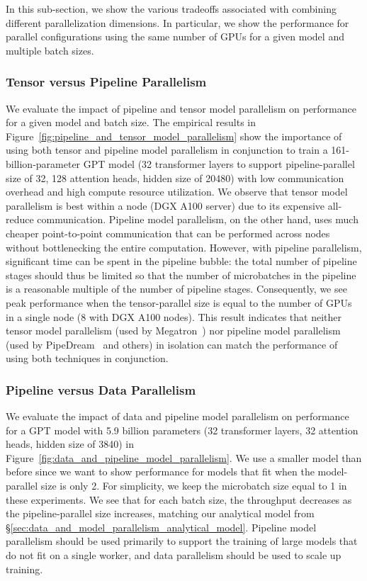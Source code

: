 In this sub-section, we show the various tradeoffs associated with combining different parallelization dimensions. In particular, we show the performance for parallel configurations using the same number of GPUs for a given model and multiple batch sizes.

\subsubsection{Tensor versus Pipeline Parallelism}

We evaluate the impact of pipeline and tensor model parallelism on performance for a given model and batch size. The empirical results in Figure~\ref{fig:pipeline_and_tensor_model_parallelism} show the importance of using both tensor and pipeline model parallelism in conjunction to train a 161-billion-parameter GPT model (32 transformer layers to support pipeline-parallel size of 32, 128 attention heads, hidden size of 20480) with low communication overhead and high compute resource utilization. We observe that tensor model parallelism is best within a node (DGX A100 server) due to its expensive all-reduce communication. Pipeline model parallelism, on the other hand, uses much cheaper point-to-point communication that can be performed across nodes without bottlenecking the entire computation. However, with pipeline parallelism, significant time can be spent in the pipeline bubble: the total number of pipeline stages should thus be limited so that the number of microbatches in the pipeline is a reasonable multiple of the number of pipeline stages. Consequently, we see peak performance when the tensor-parallel size is equal to the number of GPUs in a single node (8 with DGX A100 nodes). This result indicates that neither tensor model parallelism (used by Megatron~\cite{shoeybi2019megatron}) nor pipeline model parallelism (used by PipeDream~\cite{narayanan2021memory} and others) in isolation can match the performance of using both techniques in conjunction.

\subsubsection{Pipeline versus Data Parallelism}

We evaluate the impact of data and pipeline model parallelism on performance for a GPT model with 5.9 billion parameters (32 transformer layers, 32 attention heads, hidden size of 3840) in Figure~\ref{fig:data_and_pipeline_model_parallelism}. We use a smaller model than before since we want to show performance for models that fit when the model-parallel size is only 2. For simplicity, we keep the microbatch size equal to 1 in these experiments. We see that for each batch size, the throughput decreases as the pipeline-parallel size increases, matching our analytical model from \S\ref{sec:data_and_model_parallelism_analytical_model}. Pipeline model parallelism should be used primarily to support the training of large models that do not fit on a single worker, and data parallelism should be used to scale up training.

